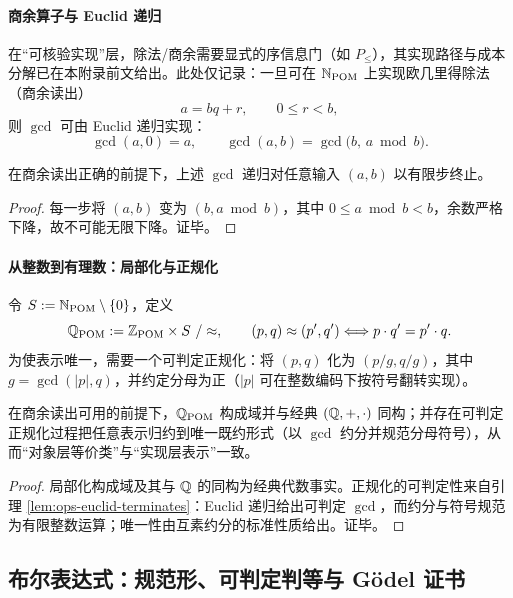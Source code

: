\paragraph{商余算子与 Euclid 递归}
在“可核验实现”层，除法/商余需要显式的序信息门（如 $P_{\le}$），其实现路径与成本分解已在本附录前文给出。此处仅记录：一旦可在 $\mathbb{N}_{\mathrm{POM}}$ 上实现欧几里得除法（商余读出）
$$
a=bq+r,\qquad 0\le r<b,
$$
则 $\gcd$ 可由 Euclid 递归实现：
$$
\gcd(a,0)=a,\qquad \gcd(a,b)=\gcd\bigl(b,\,a\bmod b\bigr).
$$

\begin{lemma}\label{lem:ops-euclid-terminates}
在商余读出正确的前提下，上述 $\gcd$ 递归对任意输入 $(a,b)$ 以有限步终止。
\end{lemma}

\begin{proof}
每一步将 $(a,b)$ 变为 $(b,a\bmod b)$，其中 $0\le a\bmod b<b$，余数严格下降，故不可能无限下降。证毕。
\end{proof}

\paragraph{从整数到有理数：局部化与正规化}
令 $S:=\mathbb{N}_{\mathrm{POM}}\setminus\{0\}$，定义
$$
\mathbb{Q}_{\mathrm{POM}}:=\mathbb{Z}_{\mathrm{POM}}\times S\ /\approx,\qquad
(p,q)\approx(p',q')\Longleftrightarrow p\cdot q'=p'\cdot q .
$$
为使表示唯一，需要一个可判定正规化：将 $(p,q)$ 化为 $(p/g,q/g)$，其中 $g=\gcd(|p|,q)$，并约定分母为正（$|p|$ 可在整数编码下按符号翻转实现）。

\begin{theorem}[有理域涌现与唯一正规形]\label{thm:ops-q-field}
在商余读出可用的前提下，$\mathbb{Q}_{\mathrm{POM}}$ 构成域并与经典 $(\mathbb{Q},+,\cdot)$ 同构；并存在可判定正规化过程把任意表示归约到唯一既约形式（以 $\gcd$ 约分并规范分母符号），从而“对象层等价类”与“实现层表示”一致。
\end{theorem}

\begin{proof}
局部化构成域及其与 $\mathbb{Q}$ 的同构为经典代数事实。正规化的可判定性来自引理 \ref{lem:ops-euclid-terminates}：Euclid 递归给出可判定 $\gcd$，而约分与符号规范为有限整数运算；唯一性由互素约分的标准性质给出。证毕。
\end{proof}

\subsection{布尔表达式：规范形、可判定判等与 Gödel 证书}\label{subsec:ops-bool-cert}

